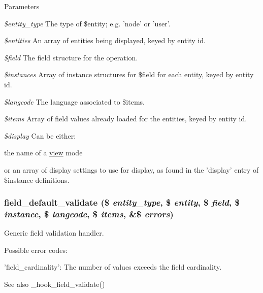 \begin{DoxyParams}{Parameters}
\item[{\em \$entity\_\-type}]The type of \$entity; e.g. 'node' or 'user'. \item[{\em \$entities}]An array of entities being displayed, keyed by entity id. \item[{\em \$field}]The field structure for the operation. \item[{\em \$instances}]Array of instance structures for \$field for each entity, keyed by entity id. \item[{\em \$langcode}]The language associated to \$items. \item[{\em \$items}]Array of field values already loaded for the entities, keyed by entity id. \item[{\em \$display}]Can be either:
\begin{DoxyItemize}
\item the name of a \hyperlink{classview}{view} mode
\item or an array of display settings to use for display, as found in the 'display' entry of \$instance definitions. 
\end{DoxyItemize}\end{DoxyParams}
\hypertarget{field_8default_8inc_a22b00edd6421db4d6b3c8d76e7cfa514}{
\subsubsection[{field\_\-default\_\-validate}]{\setlength{\rightskip}{0pt plus 5cm}field\_\-default\_\-validate (\$ {\em entity\_\-type}, \/  \$ {\em entity}, \/  \$ {\em field}, \/  \$ {\em instance}, \/  \$ {\em langcode}, \/  \$ {\em items}, \/  \&\$ {\em errors})}}
\label{field_8default_8inc_a22b00edd6421db4d6b3c8d76e7cfa514}
Generic field validation handler.

Possible error codes:
\begin{DoxyItemize}
\item 'field\_\-cardinality': The number of values exceeds the field cardinality.
\end{DoxyItemize}

\begin{DoxySeeAlso}{See also}
\_\-hook\_\-field\_\-validate()
\end{DoxySeeAlso}

